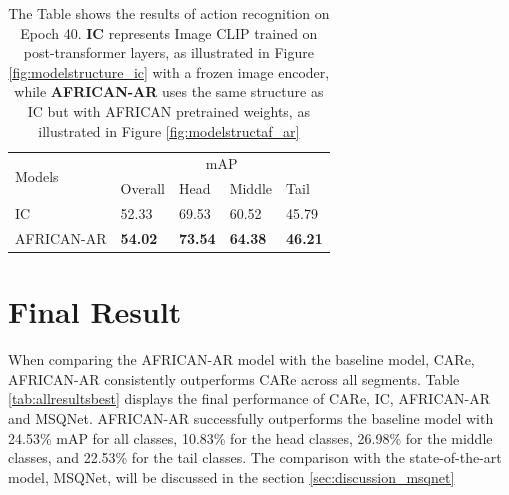 \begin{table}[ht]
    \centering
    \caption[Results of action recognition (Epoch 40)]{The Table shows the results of action recognition on Epoch 40. \textbf{IC} represents Image CLIP trained on post-transformer layers, as illustrated in Figure \ref{fig:modelstructure_ic} with a frozen image encoder, while \textbf{AFRICAN-AR} uses the same structure as IC but with AFRICAN pretrained weights, as illustrated in Figure \ref{fig:modelstructaf_ar}}
    \label{tab:allresults40}
    \begin{tabular}{lllll}
        \toprule
        \multirow{2}{*}{Models} & \multicolumn{4}{c}{mAP} \\
        \cmidrule{2-5} 
        {} & Overall & Head  & Middle & Tail \\
        \midrule
        IC            & 52.33   & 69.53 & 60.52 & 45.79 \\        
        AFRICAN-AR    & \textbf{54.02} & \textbf{73.54} & \textbf{64.38} & \textbf{46.21} \\
        \bottomrule
    \end{tabular}
\end{table}


\section{Final Result}
When comparing the AFRICAN-AR model with the baseline model, CARe, AFRICAN-AR consistently outperforms CARe across all segments. Table \ref{tab:allresultsbest} displays the final performance of CARe, IC, AFRICAN-AR and MSQNet. AFRICAN-AR successfully outperforms the baseline model with 24.53\% mAP for all classes, 10.83\% for the head classes, 26.98\% for the middle classes, and 22.53\% for the tail classes. The comparison with the state-of-the-art model, MSQNet, will be discussed in the section \ref{sec:discussion_msqnet}

